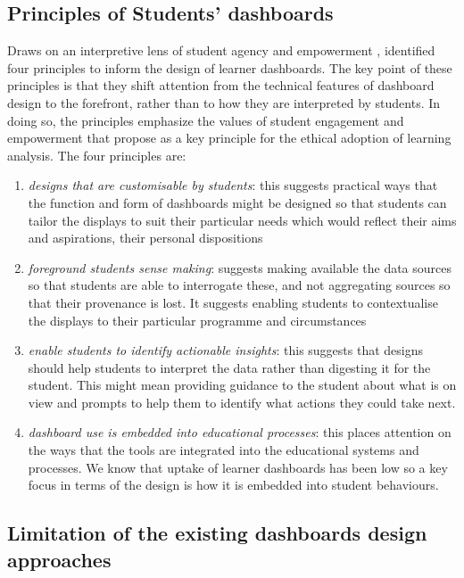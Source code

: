 \documentclass[preprint,12pt]{elsarticle}
\begin{document}
\subsection{Principles of Students' dashboards}
Draws on an  interpretive lens of student agency and empowerment \cite{slade2013learning}, \citet{bennett2019four} identified four  principles to inform the design of learner dashboards. The key point of these principles is that they shift attention from the technical features of dashboard design to the forefront, rather than to how they are interpreted by students. In doing so, the principles emphasize the values of student engagement and empowerment that \citet{prinsloo2017big}  propose as a key principle for the ethical adoption of learning analysis. The four principles are: 
\begin{enumerate}
    \item \textit{designs that are  customisable by students}: this suggests practical ways that the function and form of dashboards might be designed so that students can tailor the displays to suit their particular needs which would reflect their aims and aspirations, their personal dispositions 
    \item \textit{foreground students sense making}: suggests making
    available the data sources so that students are able to interrogate these, and not aggregating sources so that their provenance is lost. It suggests enabling students to contextualise the displays to their particular programme and circumstances
    \item \textit{enable students to identify  actionable insights}: this suggests that designs should help students to interpret the data rather than digesting it for the student. This might mean providing guidance to the student about what is on view and prompts to help them to identify what actions they could take next.
    \item \textit{dashboard use is embedded into educational processes}: this places attention on the ways
    that the tools are integrated into the educational systems and processes. We know that uptake of learner dashboards has been low \cite{bodily2017trends} so a key focus in terms of the design is how it is embedded into student behaviours.
\end{enumerate}

\subsection{Limitation of the existing dashboards design approaches}
\end{document}
